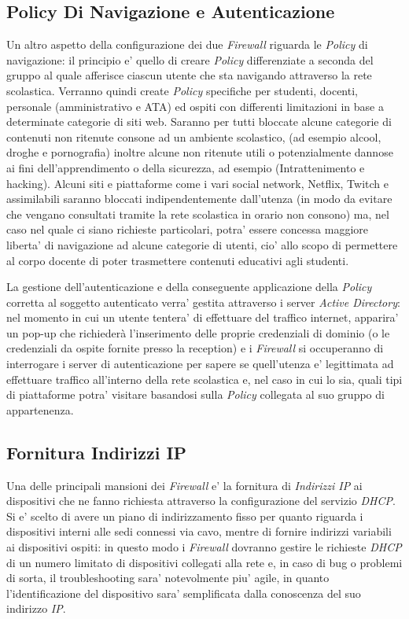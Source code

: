 \documentclass{report}
\begin{document}
			\subsection{Policy Di Navigazione e Autenticazione}
				Un altro aspetto della configurazione dei due \emph{Firewall} riguarda le \emph{Policy} di navigazione: il
				principio e' quello di creare \emph{Policy} differenziate a seconda del gruppo al quale afferisce ciascun utente 
				che sta navigando attraverso la rete scolastica. Verranno quindi create \emph{Policy} specifiche per studenti,
				docenti, personale (amministrativo e ATA) ed ospiti con differenti limitazioni in base a determinate categorie
				di siti web. Saranno per tutti bloccate alcune categorie di contenuti non ritenute consone ad un ambiente
				scolastico, (ad esempio alcool, droghe e pornografia) inoltre alcune non ritenute utili o potenzialmente
				dannose ai fini dell'apprendimento o della sicurezza, ad esempio (Intrattenimento e hacking).
				Alcuni siti e piattaforme come i vari social network, Netflix, Twitch e assimilabili saranno bloccati
				indipendentemente dall'utenza (in modo da evitare che vengano consultati tramite la rete scolastica in orario
				non consono) ma, nel caso nel quale ci siano richieste particolari, potra' essere concessa maggiore liberta' di
				navigazione ad alcune categorie di utenti, cio' allo scopo di permettere al corpo docente di poter trasmettere
				contenuti educativi agli studenti.

				La gestione dell’autenticazione e della conseguente applicazione della \emph{Policy} corretta al soggetto
				autenticato verra' gestita attraverso i server \emph{Active Directory}: nel momento in cui un utente tentera'
				di effettuare del traffico internet, apparira' un pop-up che richiederà l’inserimento delle proprie
				credenziali di dominio (o le credenziali da ospite fornite presso la reception) e i \emph{Firewall}
				si occuperanno di interrogare i server di autenticazione per sapere se quell’utenza e' legittimata
				ad effettuare traffico all’interno della rete scolastica e, nel caso in cui lo sia, quali tipi di
				piattaforme potra' visitare basandosi sulla \emph{Policy} collegata al suo gruppo di
				appartenenza.
			\subsection{Fornitura Indirizzi IP}
				Una delle principali mansioni dei \emph{Firewall} e' la fornitura di \emph{Indirizzi IP} ai dispositivi che ne
				fanno richiesta attraverso la configurazione del servizio \emph{DHCP}. Si e' scelto di avere un piano di
				indirizzamento fisso per quanto riguarda i dispositivi interni alle sedi connessi via cavo, mentre di
				fornire indirizzi variabili ai dispositivi ospiti: in questo modo i \emph{Firewall} dovranno gestire le
				richieste \emph{DHCP} di un numero limitato di dispositivi collegati alla rete e, in caso di bug o
				problemi di sorta, il troubleshooting sara' notevolmente piu' agile, in quanto l'identificazione
				del dispositivo sara' semplificata dalla conoscenza del suo indirizzo \emph{IP}.
\end{document}
